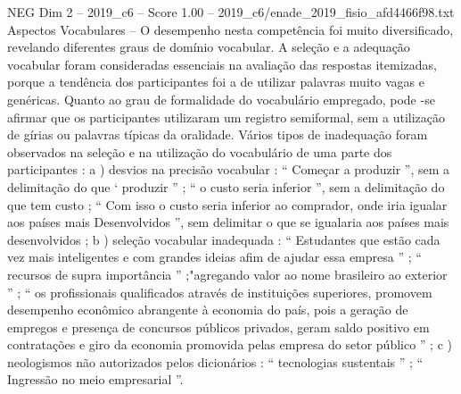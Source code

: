 \begin{textsample}{NEG Dim 2 – 2019\_c6 – Score 1.00 – 2019\_c6/enade\_2019\_fisio\_afd4466f98.txt}
Aspectos Vocabulares – O desempenho nesta competência foi muito diversificado, revelando diferentes graus de domínio vocabular.
A seleção e a adequação vocabular foram consideradas essenciais na avaliação das respostas itemizadas, porque a tendência dos participantes foi a de utilizar palavras muito vagas e genéricas.
Quanto ao grau de formalidade do vocabulário empregado, pode -se afirmar que os participantes utilizaram um registro semiformal, sem a utilização de gírias ou palavras típicas da oralidade.
Vários tipos de inadequação foram observados na seleção e na utilização do vocabulário de uma parte dos participantes : a ) desvios na precisão vocabular : “ Começar a produzir ”, sem a delimitação do que ‘ produzir ” ; “ o custo seria inferior ”, sem a delimitação do que tem custo ; “ Com isso o custo seria inferior ao comprador, onde iria igualar aos países mais Desenvolvidos ”, sem delimitar o que se igualaria aos países mais desenvolvidos ; b ) seleção vocabular inadequada : “ Estudantes que estão cada vez mais inteligentes e com grandes ideias afim de ajudar essa empresa ” ; “ recursos de supra importância ” ;"agregando valor ao nome brasileiro ao exterior ” ; “ os profissionais qualificados através de instituições superiores, promovem desempenho econômico abrangente à economia do país, pois a geração de empregos e presença de concursos públicos privados, geram saldo positivo em contratações e giro da economia promovida pelas empresa do setor público ” ; c ) neologismos não autorizados pelos dicionários : “ tecnologias sustentais ” ; “ Ingressão no meio empresarial ”.

\end{textsample}
